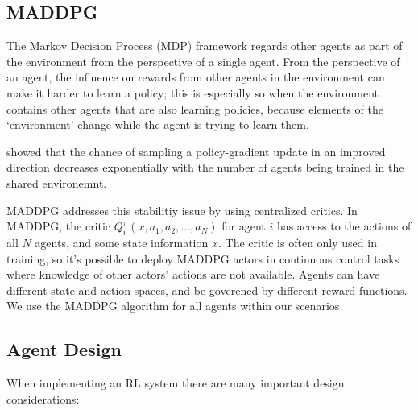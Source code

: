 \documentclass[11pt,a4paper]{article}
\begin{document}
\subsection{MADDPG}

The Markov Decision Process (MDP) framework regards other agents as part of the environment from the perspective of a single agent.
From the perspective of an agent, the influence on rewards from other agents in the environment can make it harder to learn a policy;
this is especially so when the environment contains other agents that are also learning policies,
because elements of the `environment' change while the agent is trying to learn them.

\citealp{lowe2020multiagent} showed that the chance of sampling a policy-gradient update in an improved direction decreases exponentially with the number of agents being trained in the shared environemnt.

MADDPG addresses this stabilitiy issue by using centralized critics.
In MADDPG, the critic $Q^\pi_i(x, a_1, a_2, ..., a_N)$ for agent $i$ has access to the actions of all $N$ agents, and some state information $x$.
The critic is often only used in training, so it's possible to deploy MADDPG actors in continuous control tasks where knowledge of other actors' actions are not available.
Agents can have different state and action spaces, and be goverened by different reward functions.
We use the MADDPG algorithm for all agents within our scenarios.

\subsection{Agent Design}

When implementing an RL system there are many important design considerations:
\end{document}
